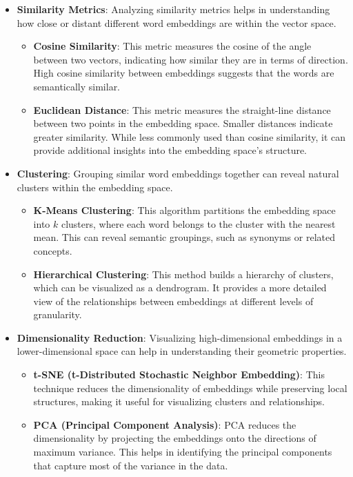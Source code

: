 \begin{itemize}
    \item \textbf{Similarity Metrics}: Analyzing similarity metrics helps in understanding how close or distant different word embeddings are within the vector space.
    \begin{itemize}
        \item \textbf{Cosine Similarity}: This metric measures the cosine of the angle between two vectors, indicating how similar they are in terms of direction. High cosine similarity between embeddings suggests that the words are semantically similar.
        \item \textbf{Euclidean Distance}: This metric measures the straight-line distance between two points in the embedding space. Smaller distances indicate greater similarity. While less commonly used than cosine similarity, it can provide additional insights into the embedding space's structure.
    \end{itemize}
    
    \item \textbf{Clustering}: Grouping similar word embeddings together can reveal natural clusters within the embedding space.
    \begin{itemize}
        \item \textbf{K-Means Clustering}: This algorithm partitions the embedding space into \( k \) clusters, where each word belongs to the cluster with the nearest mean. This can reveal semantic groupings, such as synonyms or related concepts.
        \item \textbf{Hierarchical Clustering}: This method builds a hierarchy of clusters, which can be visualized as a dendrogram. It provides a more detailed view of the relationships between embeddings at different levels of granularity.
    \end{itemize}
    
    \item \textbf{Dimensionality Reduction}: Visualizing high-dimensional embeddings in a lower-dimensional space can help in understanding their geometric properties.
    \begin{itemize}
        \item \textbf{t-SNE (t-Distributed Stochastic Neighbor Embedding)}: This technique reduces the dimensionality of embeddings while preserving local structures, making it useful for visualizing clusters and relationships.
        \item \textbf{PCA (Principal Component Analysis)}: PCA reduces the dimensionality by projecting the embeddings onto the directions of maximum variance. This helps in identifying the principal components that capture most of the variance in the data.
    \end{itemize}


\end{itemize}
